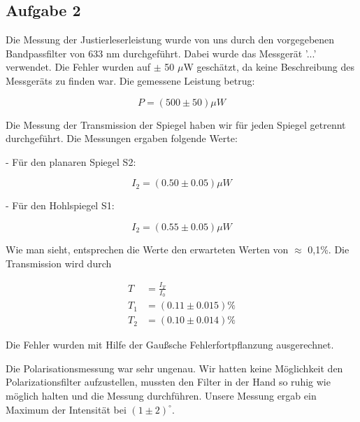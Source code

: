 \subsection{Aufgabe 2}

Die Messung der Justierleserleistung wurde von uns durch den vorgegebenen Bandpassfilter von 633 nm durchgeführt. Dabei wurde das Messgerät '...' verwendet. Die Fehler wurden auf $\pm$ 50 $\mu$W geschätzt, da keine Beschreibung des Messgeräts zu finden war. Die gemessene Leistung betrug:

\begin{equation}
P = (500 \pm 50) \mu W
\end{equation}

Die Messung der Transmission der Spiegel haben wir für jeden Spiegel getrennt durchgeführt. Die Messungen ergaben folgende Werte:

- Für den planaren Spiegel S2:

\begin{equation}
I_{2} = (0.50 \pm 0.05) \mu W
\end{equation}

- Für den Hohlspiegel S1:

\begin{equation}
	I_{2} = (0.55 \pm 0.05) \mu W
\end{equation}

Wie man sieht, entsprechen die Werte den erwarteten Werten von $\approx$ 0,1\%. Die Transmission wird durch 

\begin{align}
	T &= \frac{I_{T}}{I_{0}} \\
	T_{1} &= (0.11 \pm 0.015)\% \\
	T_{2} &= (0.10 \pm 0.014)\% 
\end{align}

Die Fehler wurden mit Hilfe der Gaußsche Fehlerfortpflanzung ausgerechnet.

Die Polarisationsmessung war sehr ungenau. Wir hatten keine Möglichkeit den Polarizationsfilter aufzustellen, mussten den Filter in der Hand so ruhig wie möglich halten und die Messung durchführen. Unsere Messung ergab ein Maximum der Intensität bei $(1 \pm 2)^{\circ}$.